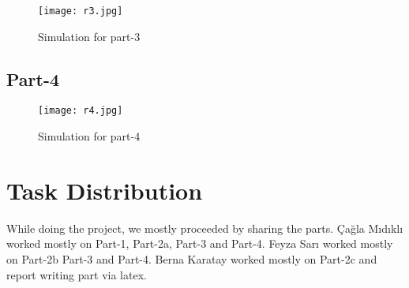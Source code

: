 \documentclass[12pt]{article}
\begin{document}
\begin{figure}[H]
    \centering
    \texttt{[image: r3.jpg]}
    \caption{Simulation for part-3}
    \label{fig:result3}
\end{figure}

\clearpage

 \subsection{Part-4}
 
\begin{figure}[H]
    \centering
    \texttt{[image: r4.jpg]}
    \caption{Simulation for part-4}
    \label{fig:result4}
\end{figure}

 \vspace{1cm}
\section{Task Distribution}
While doing the project, we mostly proceeded by sharing the parts. Çağla Mıdıklı worked mostly on Part-1, Part-2a, Part-3 and Part-4. Feyza Sarı worked mostly on Part-2b Part-3 and Part-4. Berna Karatay worked mostly on Part-2c and report writing part via latex.  
\end{document}
